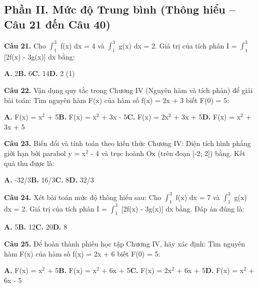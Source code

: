 \documentclass[11pt,a4paper]{article}
\begin{document}
\subsection*{\color{accent} Phần II. Mức độ Trung bình (Thông hiểu -- Câu 21 đến Câu 40)}
\textbf{\color{primary} Câu 21.} Cho $\int_{1}^{3}$ f(x) dx = 4 và $\int_{1}^{3}$ g(x) dx = 2. Giá trị của tích phân I = $\int_{1}^{3}$ [2f(x) - 3g(x)] dx bằng:\par
\hspace*{1.5em}\textbf{A.} 2\quad\quad \textbf{B.} 6\quad\quad \textbf{C.} 14\quad\quad \textbf{D.} 2 (1)\par\vspace{2pt}
\textbf{\color{primary} Câu 22.} Vận dụng quy tắc trong Chương IV (Nguyên hàm và tích phân) để giải bài toán: Tìm nguyên hàm F(x) của hàm số f(x) = 2x + 3 biết F(0) = 5:\par
\hspace*{1.5em}\textbf{A.} F(x) = x$^2$ + 5\quad\quad \textbf{B.} F(x) = x$^2$ + 3x - 5\quad\quad \textbf{C.} F(x) = 2x$^2$ + 3x + 5\quad\quad \textbf{D.} F(x) = x$^2$ + 3x + 5\par\vspace{2pt}
\textbf{\color{primary} Câu 23.} Biến đổi và tính toán theo kiến thức Chương IV: Diện tích hình phẳng giới hạn bởi parabol y = x$^2$ - 4 và trục hoành Ox (trên đoạn [-2; 2]) bằng. Kết quả thu được là:\par
\hspace*{1.5em}\textbf{A.} -32/3\quad\quad \textbf{B.} 16/3\quad\quad \textbf{C.} 8\quad\quad \textbf{D.} 32/3\par\vspace{2pt}
\textbf{\color{primary} Câu 24.} Xét bài toán mức độ thông hiểu sau: Cho $\int_{1}^{3}$ f(x) dx = 7 và $\int_{1}^{3}$ g(x) dx = 2. Giá trị của tích phân I = $\int_{1}^{3}$ [2f(x) - 3g(x)] dx bằng. Đáp án đúng là:\par
\hspace*{1.5em}\textbf{A.} 5\quad\quad \textbf{B.} 12\quad\quad \textbf{C.} 20\quad\quad \textbf{D.} 8\par\vspace{2pt}
\textbf{\color{primary} Câu 25.} Để hoàn thành phiếu học tập Chương IV, hãy xác định: Tìm nguyên hàm F(x) của hàm số f(x) = 2x + 6 biết F(0) = 5:\par
\hspace*{1.5em}\textbf{A.} F(x) = x$^2$ + 5\quad\quad \textbf{B.} F(x) = x$^2$ + 6x + 5\quad\quad \textbf{C.} F(x) = 2x$^2$ + 6x + 5\quad\quad \textbf{D.} F(x) = x$^2$ + 6x - 5\par\vspace{2pt}
\end{document}
